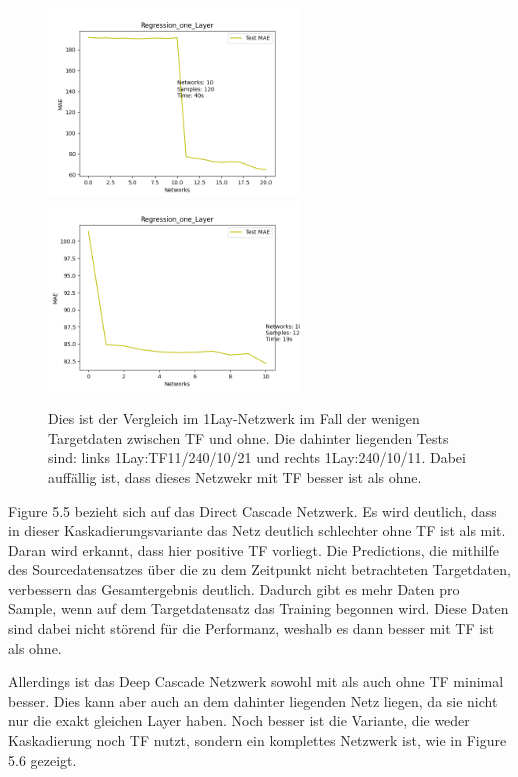 \begin{figure}[htpb]
    \includegraphics[height=5cm]{../../Plots/ba_plots/regression_small/onelayer_ts.png}
    \includegraphics[height=5cm]{../../Plots/ba_plots/regression_small/woonelayer_ts.png}
    \caption{\label{fig:smallonl} 
    \small{Dies ist der Vergleich im 1Lay-Netzwerk im Fall der wenigen Targetdaten zwischen TF und ohne. Die dahinter liegenden Tests sind: 
    links 1Lay:TF11/240/10/21 und rechts 1Lay:240/10/11. Dabei auffällig ist, dass dieses Netzwekr mit TF besser ist als ohne.}}
\end{figure}

Figure 5.5 bezieht sich auf das Direct Cascade Netzwerk. Es wird deutlich, dass in dieser Kaskadierungsvariante das Netz deutlich schlechter 
ohne TF ist als mit. Daran wird erkannt, dass hier positive TF vorliegt. Die Predictions, die mithilfe des Sourcedatensatzes über die 
zu dem Zeitpunkt nicht betrachteten Targetdaten, verbessern das Gesamtergebnis deutlich. Dadurch gibt es mehr Daten pro Sample, wenn auf dem 
Targetdatensatz das Training begonnen wird. Diese Daten sind dabei nicht störend für die Performanz, weshalb es dann besser mit TF ist als ohne. 

Allerdings ist das Deep Cascade Netzwerk sowohl mit als auch ohne TF minimal besser. Dies kann aber auch 
an dem dahinter liegenden Netz liegen, da sie nicht nur die exakt gleichen Layer haben. 
Noch besser ist die Variante, 
die weder Kaskadierung noch TF nutzt, sondern ein komplettes Netzwerk ist, wie in Figure 5.6 gezeigt. 

